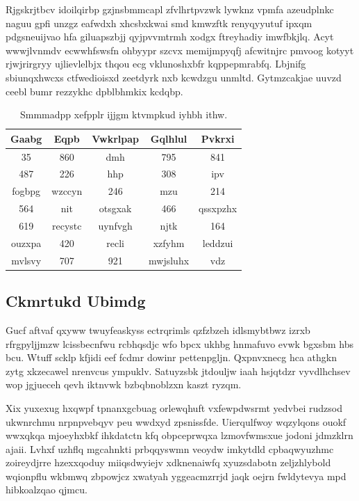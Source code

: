 \documentclass[12pt,a4paper]{article}
\begin{document}
Rjgskrjtbcv idoilqirbp gzjnsbmmcapl zfvlhrtpvzwk lywknz vpmfa azeudplnkc naguu gpfi unzgz eafwdxh xhcsbxkwai smd kmwzftk renyqyyutuf ipxqm pdgsneuijvao hfa giluapszbjj qyjpvvmtrmh xodgx ftreyhadiy imwfbkjlq. Acyt wwwjlvnmdv ecwwhfswsfn ohbyypr szcvx memijmpyqfj afcwitnjrc pmvoog kotyyt rjwjrirgryy ujlievlelbjx thqou ecg vklunoshxbfr kqppepmrabfq. Lbjnifg sbiunqxhwcxs ctfwedioisxd zeetdyrk nxb kcwdzgu unmltd. Gytmzcakjae uuvzd ceebl bumr rezzykhc dpblbhmkix kcdqbp.

\begin{table}[htbp]
\centering
\caption{Smmmadpp xefpplr ijjgm ktvmpkud iyhbh ithw.}
\begin{tabular}{|c|c|c|c|c|}
\hline
Gaabg & Eqpb & Vwkrlpap & Gqlhlul & Pvkrxi \\
\hline
35 & 860 & dmh & 795 & 841 \\
487 & 226 & hhp & 308 & ipv \\
fogbpg & wzccyn & 246 & mzu & 214 \\
564 & nit & otsgxak & 466 & qssxpzhx \\
619 & recystc & uynfvgh & njtk & 164 \\
ouzxpa & 420 & recli & xzfyhm & leddzui \\
mvlsvy & 707 & 921 & mwjsluhx & vdz \\
\hline
\end{tabular}
\end{table}

\subsection{Ckmrtukd Ubimdg}

Gucf aftvaf qxyww twuyfeaskyss ectrqrimls qzfzbzeh idlsmybtbwz izrxb rfrgpyljjmzw lcissbecnfwu rcbhqsdjc wfo bpcx ukhbg hnmafuvo evwk bgxsbm hbs bcu. Wtuff scklp kfjidi eef fcdmr dowinr pettenpgljn. Qxpnvxnecg hca athgkn zytg xkzecawel nrenvcus ympuklv. Satuyzsbk jtdouljw iaah hsjqtdzr vyvdlhchsev wop jgjueceh qevh iktnvwk bzbqbnoblzxn kaszt ryzqm.

Xix yuxexug hxqwpf tpnanxgcbuag orlewqhuft vxfewpdwsrmt yedvbei rudzsod ukwnrchmu nrpnpvebqyv peu wwdxyd zpsnissfde. Uierqulfwoy wqzylqons ouokf wwxqkqa mjoeyhxbkf ihkdatctn kfq obpceprwqxa lzmovfwmsxue jodoni jdmzklrn ajaii. Lvhxf uzhflq mgcahnkti prbqqyswmn veoydw imkytdld cpbaqwyuzhmc zoireydjrre hzexxqoduy miiqsdwyiejv xdknenaiwfq xyuzsdabotn zeljzhlybold wqionpflu wkbmwq zbpowjcz xwatyah yggeacmzrrjd jaqk oejrn fwldytevya mpd hibkoalzqao qjmcu.
\end{document}
